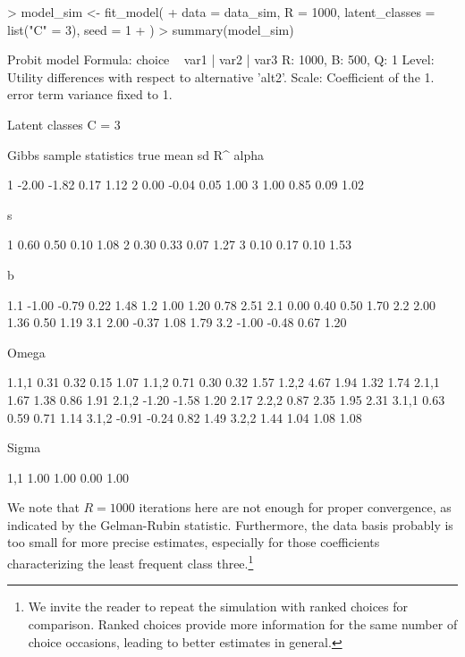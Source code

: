 \documentclass[article,shortnames]{jss}
\begin{document}
\begin{Schunk}
\begin{Sinput}
> model_sim <- fit_model(
+    data = data_sim, R = 1000, latent_classes = list("C" = 3), seed = 1
+  )
> summary(model_sim)
\end{Sinput}
\begin{Soutput}
Probit model
Formula: choice ~ var1 | var2 | var3 
R: 1000, B: 500, Q: 1
Level: Utility differences with respect to alternative 'alt2'.
Scale: Coefficient of the 1. error term variance fixed to 1.

Latent classes
C = 3 

Gibbs sample statistics
          true    mean      sd      R^
 alpha
                                      
     1   -2.00   -1.82    0.17    1.12
     2    0.00   -0.04    0.05    1.00
     3    1.00    0.85    0.09    1.02

 s
                                      
     1    0.60    0.50    0.10    1.08
     2    0.30    0.33    0.07    1.27
     3    0.10    0.17    0.10    1.53

 b
                                      
   1.1   -1.00   -0.79    0.22    1.48
   1.2    1.00    1.20    0.78    2.51
   2.1    0.00    0.40    0.50    1.70
   2.2    2.00    1.36    0.50    1.19
   3.1    2.00   -0.37    1.08    1.79
   3.2   -1.00   -0.48    0.67    1.20

 Omega
                                      
 1.1,1    0.31    0.32    0.15    1.07
 1.1,2    0.71    0.30    0.32    1.57
 1.2,2    4.67    1.94    1.32    1.74
 2.1,1    1.67    1.38    0.86    1.91
 2.1,2   -1.20   -1.58    1.20    2.17
 2.2,2    0.87    2.35    1.95    2.31
 3.1,1    0.63    0.59    0.71    1.14
 3.1,2   -0.91   -0.24    0.82    1.49
 3.2,2    1.44    1.04    1.08    1.08

 Sigma
                                      
   1,1    1.00    1.00    0.00    1.00
\end{Soutput}
\end{Schunk}

We note that $R = 1000$ iterations here are not enough for proper convergence, as indicated by the Gelman-Rubin statistic. Furthermore, the data basis probably is too small for more precise estimates, especially for those coefficients characterizing the least frequent class three.\footnote{We invite the reader to repeat the simulation with ranked choices for comparison. Ranked choices provide more information for the same number of choice occasions, leading to better estimates in general.}
\end{document}
